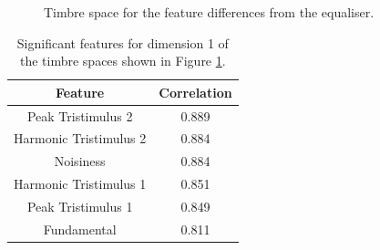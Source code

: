		\begin{figure}[h!]
			\centering
			\qquad
			\caption{Timbre space for the feature differences from the equaliser.}
			\label{fig:EqualiserDifferenceMDSs}
		\end{figure}

		\begin{table}[h!]
			\centering
			\begin{tabular}{|c|c|}
				\hline
				\bf{Feature} & \bf{Correlation} \\
				\hline
				\hline
				Peak Tristimulus 2 & 0.889 \\
				\hline
				Harmonic Tristimulus 2 & 0.884 \\
				\hline
				Noisiness & 0.884 \\
				\hline
				Harmonic Tristimulus 1 & 0.851 \\
				\hline
				Peak Tristimulus 1 & 0.849 \\
				\hline
				Fundamental & 0.811 \\
				\hline
			\end{tabular}
			\caption{Significant features for dimension 1 of the timbre spaces shown in Figure 
				 \ref{fig:EqualiserDifferenceMDSs}.}
			\label{tab:EqualiserDifferenceFeaturesDim1}
		\end{table}


